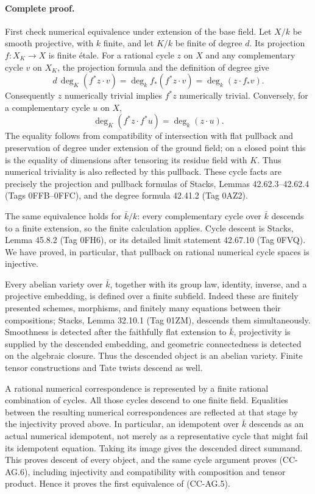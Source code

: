 \paragraph{Complete proof.}
First check numerical equivalence under extension of the base field.
Let \(X/k\) be smooth projective, with \(k\) finite, and let \(K/k\)
be finite of degree \(d\). Its projection \(f:X_K\to X\) is finite
\'etale. For a rational cycle \(z\) on \(X\) and any complementary
cycle \(v\) on \(X_K\), the projection formula and the definition of
degree give
\[
 d\,\deg_K(f^*z\cdot v)
 =\deg_k f_*(f^*z\cdot v)
 =\deg_k(z\cdot f_*v).                           \tag{CC-AG.7}
\]
Consequently \(z\) numerically trivial implies \(f^*z\) numerically
trivial. Conversely, for a complementary cycle \(u\) on \(X\),
\[
 \deg_K(f^*z\cdot f^*u)=\deg_k(z\cdot u).
\]
The equality follows from compatibility of intersection with flat
pullback and preservation of degree under extension of the ground
field; on a closed point this is the equality of dimensions after
tensoring its residue field with \(K\). Thus numerical triviality is
also reflected by this pullback. These cycle facts are precisely the
projection and pullback formulas of Stacks, Lemmas 42.62.3--42.62.4
(Tags 0FFB--0FFC), and the degree formula 42.41.2 (Tag 0AZ2).

The same equivalence holds for \(\bar k/k\): every complementary
cycle over \(\bar k\) descends to a finite extension, so the finite
calculation applies. Cycle descent is Stacks, Lemma 45.8.2
(Tag 0FH6), or its detailed limit statement 42.67.10 (Tag 0FVQ).
We have proved, in particular, that pullback on rational numerical
cycle spaces is injective.

Every abelian variety over \(\bar k\), together with its group law,
identity, inverse, and a projective embedding, is defined over a
finite subfield. Indeed these are finitely presented schemes,
morphisms, and finitely many equations between their compositions;
Stacks, Lemma 32.10.1 (Tag 01ZM), descends them simultaneously.
Smoothness is detected after the faithfully flat extension to
\(\bar k\), projectivity is supplied by the descended embedding,
and geometric connectedness is detected on the algebraic closure.
Thus the descended object is an abelian variety. Finite tensor
constructions and Tate twists descend as well.

A rational numerical correspondence is represented by a finite
rational combination of cycles. All those cycles descend to one
finite field. Equalities between the resulting numerical
correspondences are reflected at that stage by the injectivity
proved above. In particular, an idempotent over \(\bar k\) descends
as an actual numerical idempotent, not merely as a representative
cycle that might fail its idempotent equation. Taking its image gives
the descended direct summand. This proves descent of every object,
and the same cycle argument proves (CC-AG.6), including injectivity
and compatibility with composition and tensor product. Hence it
proves the first equivalence of (CC-AG.5).

